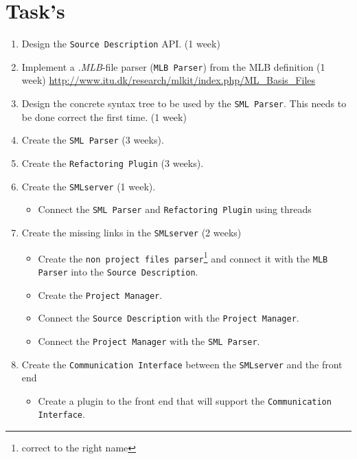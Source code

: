 \documentclass[a4paper,oneside]{memoir}
\begin{document}
\section{Task's}

\begin{enumerate}
\item Design the \texttt{Source Description} API. (1 week)

\item Implement a \textit{.MLB}-file parser (\texttt{MLB Parser}) from the MLB
  definition (1 week)
\url{http://www.itu.dk/research/mlkit/index.php/ML_Basis_Files}

\item Design the concrete syntax tree to be used by the \texttt{SML
    Parser}. This needs to be done correct the first time. (1 week)

\item Create the \texttt{SML Parser} (3 weeks).

\item Create the \texttt{Refactoring Plugin} (3 weeks).

\item Create the \texttt{SMLserver} (1 week).
  \begin{itemize}
  \item Connect the \texttt{SML Parser} and \texttt{Refactoring
      Plugin} using threads
  \end{itemize}

\item Create the missing links in the \texttt{SMLserver} (2 weeks)
  \begin{itemize}
  \item Create the \texttt{non project files parser}\footnote{correct to the
      right name} and connect it with the \texttt{MLB Parser} into the
    \texttt{Source Description}.

  \item Create the \texttt{Project Manager}.

  \item Connect the \texttt{Source Description} with the \texttt{Project
      Manager}.

  \item Connect the \texttt{Project Manager} with the \texttt{SML Parser}.
  \end{itemize}

\item Create the \texttt{Communication Interface} between the
  \texttt{SMLserver} and the front end
  \begin{itemize}
  \item Create a plugin to the front end that will support the
    \texttt{Communication Interface}.
  \end{itemize}
\end{enumerate}
\end{document}
